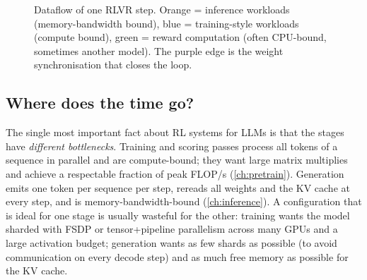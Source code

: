 \begin{figure}[t]
\centering
{}
\caption{Dataflow of one RLVR step. Orange = inference workloads (memory-bandwidth bound),
blue = training-style workloads (compute bound), green = reward computation (often CPU-bound,
sometimes another model). The purple edge is the weight synchronisation that closes the loop.}
\label{fig:rlsys:dataflow}
\end{figure}

\subsection{Where does the time go?}

The single most important fact about RL systems for LLMs is that the stages have
\emph{different bottlenecks}. Training and scoring passes process all tokens of a sequence in
parallel and are compute-bound; they want large matrix multiplies and achieve a respectable
fraction of peak FLOP/s (\cref{ch:pretrain}). Generation emits one token per sequence per
step, rereads all weights and the KV cache at every step, and is memory-bandwidth-bound
(\cref{ch:inference}). A configuration that is ideal for one stage is usually wasteful for the
other: training wants the model sharded with FSDP or tensor+pipeline parallelism across many
GPUs and a large activation budget; generation wants as few shards as possible (to avoid
communication on every decode step) and as much free memory as possible for the KV cache.

